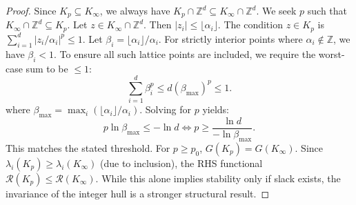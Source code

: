 \documentclass[11pt, reqno]{amsart}
\theoremstyle{definition}
\newcommand{\Z}{\mathbb{Z}}
\begin{document}
\begin{proof}
Since $K_p \subseteq K_\infty$, we always have $K_p \cap \Z^d \subseteq K_\infty \cap \Z^d$.
We seek $p$ such that $K_\infty \cap \Z^d \subseteq K_p$.
Let $z \in K_\infty \cap \Z^d$. Then $|z_i| \le \lfloor \alpha_i \rfloor$.
The condition $z \in K_p$ is $\sum_{i=1}^d |z_i/\alpha_i|^p \le 1$.
Let $\beta_i = \lfloor \alpha_i \rfloor / \alpha_i$. For strictly interior points where $\alpha_i \notin \Z$, we have $\beta_i < 1$.
To ensure all such lattice points are included, we require the worst-case sum to be $\le 1$:
\[
\sum_{i=1}^d \beta_i^p \le d (\beta_{\max})^p \le 1.
\]
where $\beta_{\max} = \max_i (\lfloor \alpha_i \rfloor / \alpha_i)$. Solving for $p$ yields:
\[
p \ln \beta_{\max} \le -\ln d \iff p \ge \frac{\ln d}{-\ln \beta_{\max}}.
\]
This matches the stated threshold. For $p \ge p_0$, $G(K_p) = G(K_\infty)$. Since $\lambda_i(K_p) \ge \lambda_i(K_\infty)$ (due to inclusion), the RHS functional $\mathcal{R}(K_p) \le \mathcal{R}(K_\infty)$. While this alone implies stability only if slack exists, the invariance of the integer hull is a stronger structural result.
\end{proof}




\end{document}

